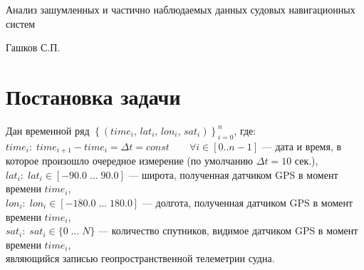 \documentclass[a4paper,12pt]{report}
\begin{document}

	\thispagestyle{empty}
	{ \large
		\begin{center}
			\renewcommand{\baselinestretch}{1.2}
			\Large
			{\Large Анализ зашумленных и частично наблюдаемых данных судовых навигационных систем}
		\end{center}
		\medskip%

		\vspace{3\bigskipamount}%
		\begin{flushright}
			\begin{minipage}{0.5\textwidth}
				\begin{flushleft}
					Гашков С.П.
				\end{flushleft}
			\end{minipage}
		\end{flushright}

		\vfill%
	}


	\large

	\onehalfspacing

	\clearpage
	\renewcommand{\thesection}{\arabic{section}}
	\graphicspath{{../pict/}}

	\section{Постановка задачи}
	Дан временной ряд
	$\left\{\left(\mathit{time}_i,\, \mathit{lat}_i,\, \mathit{lon}_i,\, \mathit{sat}_i \right) \right\}_{i=0}^{n}$, где:\\
	$time_i: \; time_{i+1} - time_i = \Delta t = const \qquad \forall i \in [0..n-1]$ --- дата и время, в которое произошло очередное измерение (по умолчанию $\Delta t  = 10$ сек.),\\
	$lat_i: \; lat_i \in [-90.0 \; \ldots \; 90.0]$ --- широта, полученная датчиком GPS в момент времени $time_i$,\\
	$lon_i: \; lon_i \in [-180.0 \; \ldots \; 180.0]$ --- долгота, полученная датчиком GPS в момент времени $time_i$,\\
	$sat_i: \; sat_i \in \{0 \; \ldots \; N\}$ --- количество спутников, видимое датчиком GPS в момент времени $time_i$,\\
	являющийся записью геопространственной телеметрии судна.
\end{document}
